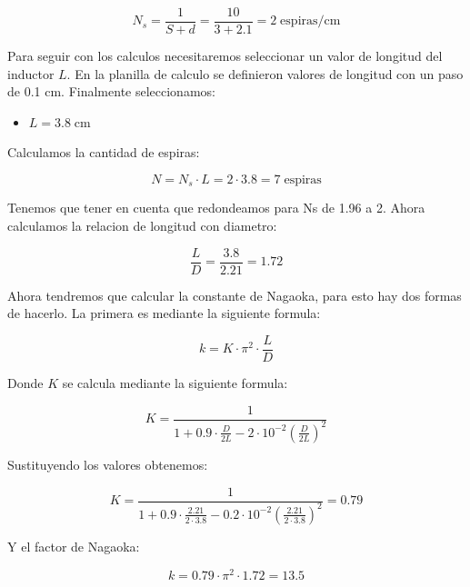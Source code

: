 \begin{equation}
    N_s = \frac{1}{S + d} = \frac{10}{3 + 2.1 } = 2\; \text{espiras/cm}
\end{equation}

Para seguir con los calculos necesitaremos seleccionar un valor de longitud del inductor $L$. En la planilla de calculo se definieron valores de longitud con un paso de 0.1 cm.
Finalmente seleccionamos:

\begin{itemize}
    \item $L = 3.8\; \text{cm}$
\end{itemize}

Calculamos la cantidad de espiras:

\begin{equation}
    N = N_s \cdot L = 2 \cdot 3.8 = 7\; \text{espiras} 
\end{equation}

Tenemos que tener en cuenta que redondeamos para Ns de 1.96 a 2. Ahora calculamos la relacion de longitud con diametro:

\begin{equation}
    \frac{L}{D} = \frac{3.8}{2.21} = 1.72
\end{equation}

Ahora tendremos que calcular la constante de Nagaoka, para esto hay dos formas de hacerlo. La primera es mediante la siguiente formula:

\begin{equation}
    k = K \cdot \pi^2 \cdot \frac{L}{D} 
\end{equation}

Donde $K$ se calcula mediante la siguiente formula:

\begin{equation}
    K = \frac{1}{1 + 0.9 \cdot \frac{D}{2L} - 2 \cdot 10^{-2} \left(\frac{D}{2L}\right)^2}
\end{equation}

Sustituyendo los valores obtenemos:

\begin{equation}
    K = \frac{1}{1 + 0.9 \cdot \frac{2.21}{2 \cdot 3.8} - 0.2 \cdot 10^{-2} \left(\frac{2.21}{2 \cdot 3.8}\right)^2} = 0.79
\end{equation}

Y el factor de Nagaoka:

\begin{equation}
    k = 0.79 \cdot \pi^2 \cdot 1.72 = 13.5
\end{equation}

